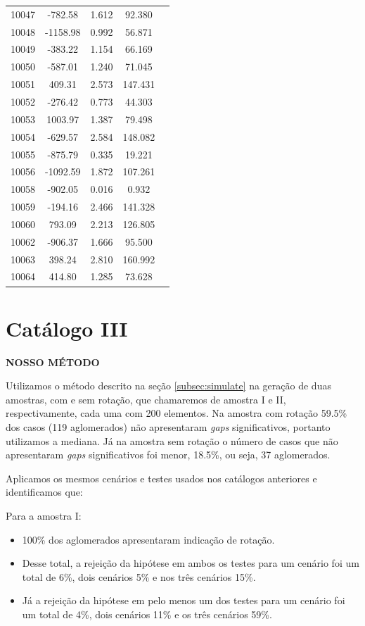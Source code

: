 {\begin{longtable}{ccccc}
10047 & -782.58 & 1.612 & 92.380\\
10048 & -1158.98 & 0.992 & 56.871\\
10049 & -383.22 & 1.154 & 66.169\\
10050 & -587.01 & 1.240 & 71.045\\
10051 & 409.31 & 2.573 & 147.431\\
10052 & -276.42 & 0.773 & 44.303\\
10053 & 1003.97 & 1.387 & 79.498\\
10054 & -629.57 & 2.584 & 148.082\\
10055 & -875.79 & 0.335 & 19.221\\
10056 & -1092.59 & 1.872 & 107.261\\
10058 & -902.05 & 0.016 & 0.932\\
10059 & -194.16 & 2.466 & 141.328\\
10060 & 793.09 & 2.213 & 126.805\\
10062 & -906.37 & 1.666 & 95.500\\
10063 & 398.24 & 2.810 & 160.992\\
10064 & 414.80 & 1.285 & 73.628\\ \hline
\end{longtable}
}

\section{Catálogo III}
\textbf{NOSSO MÉTODO}

Utilizamos o método descrito na seção \ref{subsec:simulate} na geração de duas amostras, com e sem rotação, que chamaremos de amostra I e II, respectivamente, cada uma com 200 elementos. Na amostra com rotação 59.5\% dos casos (119 aglomerados) não apresentaram \textit{gaps} significativos, portanto utilizamos a mediana. Já na amostra sem rotação o número de casos que não apresentaram \textit{gaps} significativos foi menor, 18.5\%, ou seja, 37 aglomerados.

Aplicamos os mesmos cenários e testes usados nos catálogos anteriores e identificamos que:

Para a amostra I:
\begin{itemize}
	\item 100\% dos aglomerados apresentaram indicação de rotação.
   	\item Desse total, a rejeição da hipótese em ambos os testes para um cenário foi um total de 6\%, dois cenários 5\% e nos três cenários 15\%.
   	\item Já a rejeição da hipótese em pelo menos um dos testes para um cenário foi um total de 4\%, dois cenários 11\% e os três cenários 59\%.
 \end{itemize} 

